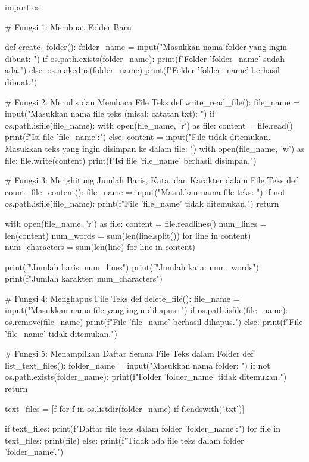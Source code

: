 \documentclass[12pt]{article}
\begin{document}
\begin{python}
     import os

# Fungsi 1: Membuat Folder Baru

def create_folder():
    folder_name = input("Masukkan nama folder yang ingin dibuat: ")
    if os.path.exists(folder_name):
        print(f"Folder '{folder_name}' sudah ada.")
    else:
        os.makedirs(folder_name)
        print(f"Folder '{folder_name}' berhasil dibuat.")

# Fungsi 2: Menulis dan Membaca File Teks
def write_read_file():
    file_name = input("Masukkan nama file teks (misal: catatan.txt): ")
    if os.path.isfile(file_name):
        with open(file_name, 'r') as file:
            content = file.read()
            print(f"Isi file '{file_name}':")
    else:
        content = input("File tidak ditemukan. Masukkan teks yang ingin disimpan ke dalam file: ")
        with open(file_name, 'w') as file:
            file.write(content)
            print(f"Isi file '{file_name}' berhasil disimpan.")

# Fungsi 3: Menghitung Jumlah Baris, Kata, dan Karakter dalam File Teks
def count_file_content():
    file_name = input("Masukkan nama file teks: ")
    if not os.path.isfile(file_name):
        print(f"File '{file_name}' tidak ditemukan.")
        return

    with open(file_name, 'r') as file:
        content = file.readlines()
        num_lines = len(content)
        num_words = sum(len(line.split()) for line in content)
        num_characters = sum(len(line) for line in content)

    print(f"Jumlah baris: {num_lines}")
    print(f"Jumlah kata: {num_words}")
    print(f"Jumlah karakter: {num_characters}")

# Fungsi 4: Menghapus File Teks
def delete_file():
    file_name = input("Masukkan nama file yang ingin dihapus: ")
    if os.path.isfile(file_name):
        os.remove(file_name)
        print(f"File '{file_name}' berhasil dihapus.")
    else:
        print(f"File '{file_name}' tidak ditemukan.")

# Fungsi 5: Menampilkan Daftar Semua File Teks dalam Folder
def list_text_files():
    folder_name = input("Masukkan nama folder: ")
    if not os.path.exists(folder_name):
        print(f"Folder '{folder_name}' tidak ditemukan.")
        return

    text_files = [f for f in os.listdir(folder_name) if f.endswith('.txt')]
    
    if text_files:
        print(f"Daftar file teks dalam folder '{folder_name}':")
        for file in text_files:
            print(file)
    else:
        print(f"Tidak ada file teks dalam folder '{folder_name}'.")


\end{python}
\end{document}
